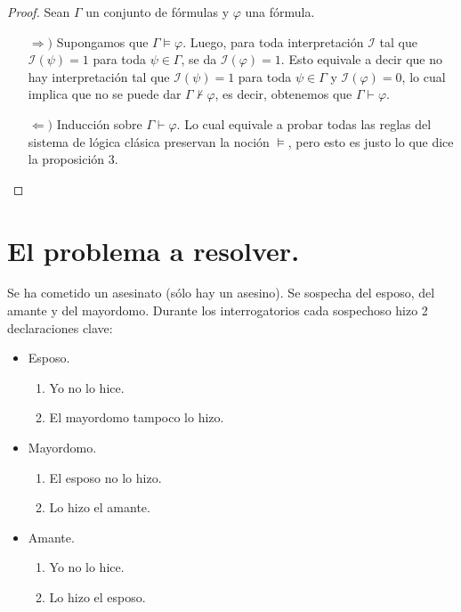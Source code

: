 \documentclass[letterpaper,12pt]{article}
\begin{document}
    \begin{proof}
        Sean $\Gamma$ un conjunto de fórmulas y $\varphi$ una fórmula.
        \begin{itemize}
            \item[$\Rightarrow )$] Supongamos que $\Gamma \models \varphi$.
            Luego, para toda interpretación $\mathcal{I}$ tal que 
            $\mathcal{I}(\psi) = 1$ para toda $\psi \in \Gamma$, se da
            $\mathcal{I}(\varphi) = 1$. Esto equivale a decir que no hay 
            interpretación tal que $\mathcal{I}(\psi) = 1$ para toda 
            $\psi \in \Gamma$ y $\mathcal{I}(\varphi) = 0$, lo cual 
            implica que no se puede dar $\Gamma \not \vdash \varphi$, 
            es decir, obtenemos que $\Gamma \vdash \varphi$.

            \item[$\Leftarrow )$] Inducción sobre $\Gamma \vdash \varphi$. 
            Lo cual equivale a probar todas las reglas del sistema de lógica
            clásica preservan la noción $\models$, pero esto es justo lo que
            dice la proposición 3.
        \end{itemize}
    \end{proof}

    \section{El problema a resolver.}
    Se ha cometido un asesinato (sólo hay un asesino). Se sospecha del esposo,
    del amante y del mayordomo. Durante los interrogatorios cada sospechoso 
    hizo 2 declaraciones clave:
    \begin{itemize}
        \item Esposo.
        \begin{enumerate}
            \item Yo no lo hice.
            \item El mayordomo tampoco lo hizo.
        \end{enumerate}

        \newpage
        \item Mayordomo.
        \begin{enumerate}
            \item El esposo no lo hizo.
            \item Lo hizo el amante.
        \end{enumerate}
        \item Amante.
        \begin{enumerate}
            \item Yo no lo hice.
            \item Lo hizo el esposo.
        \end{enumerate}
    \end{itemize}
\end{document}
